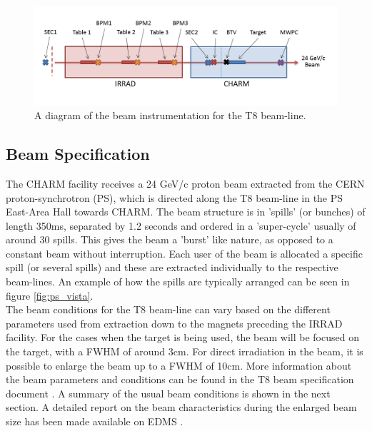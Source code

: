 \begin{figure}[!ht]
	\centering
	\includegraphics[width=\textwidth]{./images/beam_layout}
	\caption{A diagram of the beam instrumentation for the T8 beam-line.}
	\label{fig:t8_instrumets}
\end{figure}

\subsection{Beam Specification}

The CHARM facility receives a 24 GeV/c proton beam extracted from the CERN proton-synchrotron (PS), which is directed along the T8 beam-line in the PS East-Area Hall towards CHARM. The beam structure is in 'spills' (or bunches) of length 350ms, separated by 1.2 seconds and ordered in a 'super-cycle' usually of around 30 spills. This gives the beam a 'burst' like nature, as opposed to a constant beam without interruption. Each user of the beam is allocated a specific spill (or several spills) and these are extracted individually to the respective beam-lines. An example of how the spills are typically arranged can be seen in figure \ref{fig:ps_vista}. \\  

The beam conditions for the T8 beam-line can vary based on the different parameters used from extraction down to the magnets preceding the IRRAD facility. For the cases when the target is being used, the beam will be focused on the target, with a FWHM of around 3cm. For direct irradiation in the beam, it is possible to enlarge the beam up to a FWHM of 10cm. More information about the  beam parameters and conditions can be found in the T8 beam specification document \cite{Gatignon2013}. A summary of the usual beam conditions is shown in the next section. A detailed report on the beam characteristics during the enlarged beam size has been made available on EDMS \cite{charmblown}.\\

